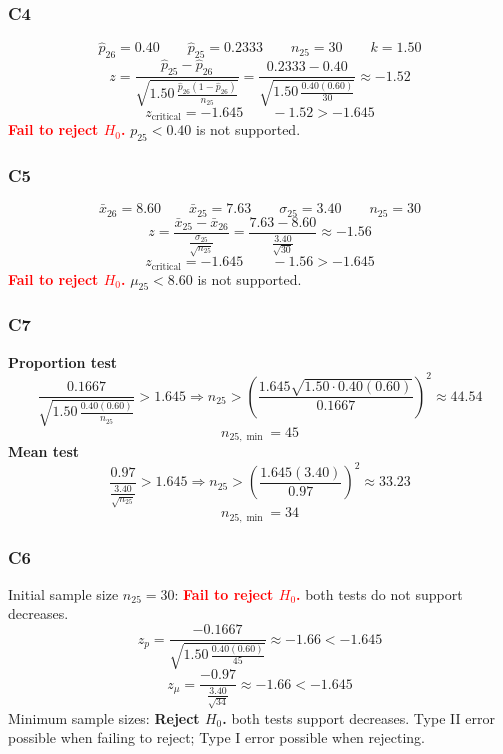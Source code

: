 \documentclass[12pt]{article}
\newcommand{\RejectDecision}[1]{\textcolor{green!60!black}{\textbf{Reject \(H_0\).}} #1}
\newcommand{\FailDecision}[1]{\textcolor{red}{\textbf{Fail to reject \(H_0\).}} #1}
\begin{document}
\subsubsection*{C4}
\[
\hat{p}_{26}=0.40\qquad \hat{p}_{25}=0.2333\qquad n_{25}=30\qquad k=1.50
\]
\[
z=\frac{\hat{p}_{25}-\hat{p}_{26}}{\sqrt{1.50\,\frac{\hat{p}_{26}(1-\hat{p}_{26})}{n_{25}}}}=\frac{0.2333-0.40}{\sqrt{1.50\,\frac{0.40(0.60)}{30}}}\approx -1.52
\]
\[
z_{\text{critical}}=-1.645\qquad -1.52>-1.645
\]
\FailDecision{\(p_{25}<0.40\) is not supported.}

\subsubsection*{C5}
\[
\bar{x}_{26}=8.60\qquad \bar{x}_{25}=7.63\qquad \sigma_{25}=3.40\qquad n_{25}=30
\]
\[
z=\frac{\bar{x}_{25}-\bar{x}_{26}}{\frac{\sigma_{25}}{\sqrt{n_{25}}}}=\frac{7.63-8.60}{\frac{3.40}{\sqrt{30}}}\approx -1.56
\]
\[
z_{\text{critical}}=-1.645\qquad -1.56>-1.645
\]
\FailDecision{\(\mu_{25}<8.60\) is not supported.}

\subsubsection*{C7}
\textbf{Proportion test}
\[
\frac{0.1667}{\sqrt{1.50\,\frac{0.40(0.60)}{n_{25}}}}>1.645\Rightarrow n_{25}>\left(\frac{1.645\sqrt{1.50\cdot 0.40(0.60)}}{0.1667}\right)^2\approx 44.54
\]
\[
n_{25,\min}=45
\]
\textbf{Mean test}
\[
\frac{0.97}{\frac{3.40}{\sqrt{n_{25}}}}>1.645\Rightarrow n_{25}>\left(\frac{1.645(3.40)}{0.97}\right)^2\approx 33.23
\]
\[
n_{25,\min}=34
\]

\subsubsection*{C6}
Initial sample size \(n_{25}=30\): \FailDecision{both tests do not support decreases.}
\[
z_p=\frac{-0.1667}{\sqrt{1.50\,\frac{0.40(0.60)}{45}}}\approx -1.66<-1.645
\]
\[
z_\mu=\frac{-0.97}{\frac{3.40}{\sqrt{34}}}\approx -1.66<-1.645
\]
Minimum sample sizes: \RejectDecision{both tests support decreases.}
Type II error possible when failing to reject; Type I error possible when rejecting.
\end{document}
